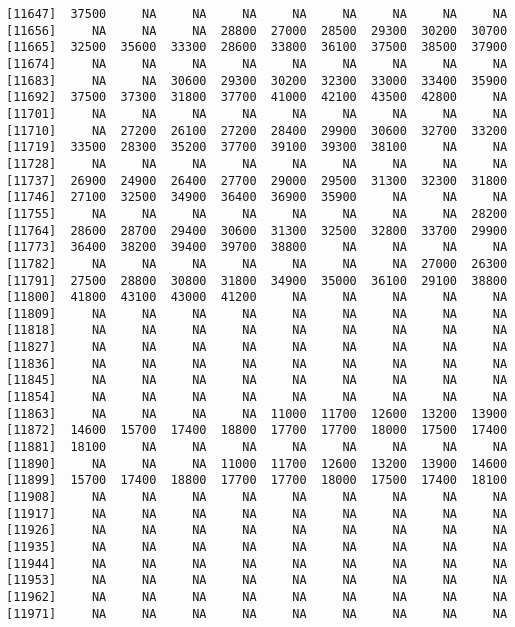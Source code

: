 \documentclass[]{article}
\begin{document}
\begin{verbatim}
[11647]  37500     NA     NA     NA     NA     NA     NA     NA     NA
[11656]     NA     NA     NA  28800  27000  28500  29300  30200  30700
[11665]  32500  35600  33300  28600  33800  36100  37500  38500  37900
[11674]     NA     NA     NA     NA     NA     NA     NA     NA     NA
[11683]     NA     NA  30600  29300  30200  32300  33000  33400  35900
[11692]  37500  37300  31800  37700  41000  42100  43500  42800     NA
[11701]     NA     NA     NA     NA     NA     NA     NA     NA     NA
[11710]     NA  27200  26100  27200  28400  29900  30600  32700  33200
[11719]  33500  28300  35200  37700  39100  39300  38100     NA     NA
[11728]     NA     NA     NA     NA     NA     NA     NA     NA     NA
[11737]  26900  24900  26400  27700  29000  29500  31300  32300  31800
[11746]  27100  32500  34900  36400  36900  35900     NA     NA     NA
[11755]     NA     NA     NA     NA     NA     NA     NA     NA  28200
[11764]  28600  28700  29400  30600  31300  32500  32800  33700  29900
[11773]  36400  38200  39400  39700  38800     NA     NA     NA     NA
[11782]     NA     NA     NA     NA     NA     NA     NA  27000  26300
[11791]  27500  28800  30800  31800  34900  35000  36100  29100  38800
[11800]  41800  43100  43000  41200     NA     NA     NA     NA     NA
[11809]     NA     NA     NA     NA     NA     NA     NA     NA     NA
[11818]     NA     NA     NA     NA     NA     NA     NA     NA     NA
[11827]     NA     NA     NA     NA     NA     NA     NA     NA     NA
[11836]     NA     NA     NA     NA     NA     NA     NA     NA     NA
[11845]     NA     NA     NA     NA     NA     NA     NA     NA     NA
[11854]     NA     NA     NA     NA     NA     NA     NA     NA     NA
[11863]     NA     NA     NA     NA  11000  11700  12600  13200  13900
[11872]  14600  15700  17400  18800  17700  17700  18000  17500  17400
[11881]  18100     NA     NA     NA     NA     NA     NA     NA     NA
[11890]     NA     NA     NA  11000  11700  12600  13200  13900  14600
[11899]  15700  17400  18800  17700  17700  18000  17500  17400  18100
[11908]     NA     NA     NA     NA     NA     NA     NA     NA     NA
[11917]     NA     NA     NA     NA     NA     NA     NA     NA     NA
[11926]     NA     NA     NA     NA     NA     NA     NA     NA     NA
[11935]     NA     NA     NA     NA     NA     NA     NA     NA     NA
[11944]     NA     NA     NA     NA     NA     NA     NA     NA     NA
[11953]     NA     NA     NA     NA     NA     NA     NA     NA     NA
[11962]     NA     NA     NA     NA     NA     NA     NA     NA     NA
[11971]     NA     NA     NA     NA     NA     NA     NA     NA     NA

\end{verbatim}
\end{document}
